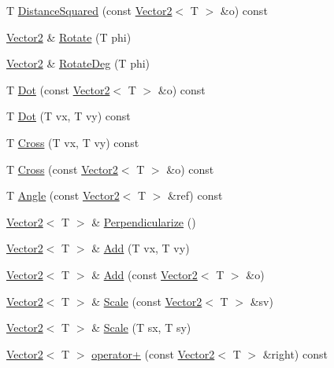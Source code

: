 \begin{DoxyCompactItemize}
\item 
T \hyperlink{classastu_1_1Vector2_ac60cbccfefd62216f648c388c5025649}{Distance\+Squared} (const \hyperlink{classastu_1_1Vector2}{Vector2}$<$ T $>$ \&o) const
\item 
\hyperlink{classastu_1_1Vector2}{Vector2} \& \hyperlink{classastu_1_1Vector2_ac2b10a554fede91faa5a0668ebe76697}{Rotate} (T phi)
\item 
\hyperlink{classastu_1_1Vector2}{Vector2} \& \hyperlink{classastu_1_1Vector2_a85d7593d86a8b74bb3a0a07b3d734ccd}{Rotate\+Deg} (T phi)
\item 
T \hyperlink{classastu_1_1Vector2_a44f449c9f23b8e5aa2739c3a50b57ceb}{Dot} (const \hyperlink{classastu_1_1Vector2}{Vector2}$<$ T $>$ \&o) const
\item 
T \hyperlink{classastu_1_1Vector2_a0fb863e03982e1583a0945873caf92d7}{Dot} (T vx, T vy) const
\item 
T \hyperlink{classastu_1_1Vector2_ad7245590bd3a503f0c388cad9008789b}{Cross} (T vx, T vy) const
\item 
T \hyperlink{classastu_1_1Vector2_ab39f342813a6f5f21a533a4345e1336c}{Cross} (const \hyperlink{classastu_1_1Vector2}{Vector2}$<$ T $>$ \&o) const
\item 
T \hyperlink{classastu_1_1Vector2_af44c9648648cb03637f520669e9a2d8e}{Angle} (const \hyperlink{classastu_1_1Vector2}{Vector2}$<$ T $>$ \&ref) const
\item 
\hyperlink{classastu_1_1Vector2}{Vector2}$<$ T $>$ \& \hyperlink{classastu_1_1Vector2_ad5a274585f092f56875d0b9bccaa0df6}{Perpendicularize} ()
\item 
\hyperlink{classastu_1_1Vector2}{Vector2}$<$ T $>$ \& \hyperlink{classastu_1_1Vector2_a253eadef97c7b539c7f275d0c789bc0d}{Add} (T vx, T vy)
\item 
\hyperlink{classastu_1_1Vector2}{Vector2}$<$ T $>$ \& \hyperlink{classastu_1_1Vector2_a9178bef75f9481b673a6b1fc9f13387f}{Add} (const \hyperlink{classastu_1_1Vector2}{Vector2}$<$ T $>$ \&o)
\item 
\hyperlink{classastu_1_1Vector2}{Vector2}$<$ T $>$ \& \hyperlink{classastu_1_1Vector2_a043ad479fa5cd5d91eae37a06e3b8e96}{Scale} (const \hyperlink{classastu_1_1Vector2}{Vector2}$<$ T $>$ \&sv)
\item 
\hyperlink{classastu_1_1Vector2}{Vector2}$<$ T $>$ \& \hyperlink{classastu_1_1Vector2_a32500c8d1ebd2b516a6b83f807857d98}{Scale} (T sx, T sy)
\item 
\hyperlink{classastu_1_1Vector2}{Vector2}$<$ T $>$ \hyperlink{classastu_1_1Vector2_a1ebf3c3f9ef6c8e07f6ea2327a630fca}{operator+} (const \hyperlink{classastu_1_1Vector2}{Vector2}$<$ T $>$ \&right) const

\end{DoxyCompactItemize}
